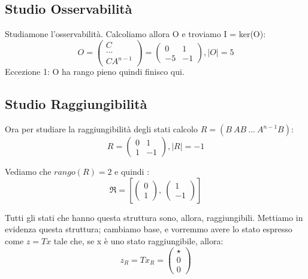 \documentclass{article}
\begin{document}
\subsection{Studio Osservabilità}

Studiamone l’osservabilità. Calcoliamo allora O e troviamo I = ker(O):
\[
 O = \begin{pmatrix}C \\ ... \\ CA^{n-1}  \end{pmatrix} = \left(\begin{matrix}0 & 1\\-5 & -1\end{matrix}\right), |O| = 5 \]
Eccezione 1: O ha rango pieno quindi finisco qui.

\subsection{Studio Raggiungibilità}
Ora per studiare la raggiungibilità degli stati calcolo $R = (B\ AB\ ...\ A^{n-1}B)$: \[ R = \left(\begin{matrix}0 & 1\\1 & -1\end{matrix}\right), |R| = -1 \] 

Vediamo che $rango(R) = 2$ e quindi : \[ \mathfrak{R} = \left[ \left(\begin{matrix}0\\1\end{matrix}\right), \  \left(\begin{matrix}1\\-1\end{matrix}\right)\right] \]

Tutti gli stati che hanno questa struttura sono, allora, raggiungibili. Mettiamo in evidenza questa struttura;
cambiamo base, e vorremmo avere lo stato espresso come $z = Tx$ tale che, se x è uno stato raggiungibile, allora: \[ z_R = T x_R = \begin{pmatrix} \star  \\ 0 \\0\end{pmatrix}\]
\end{document}
